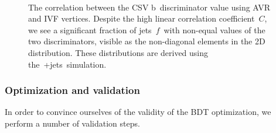 \begin{figure}
\begin{centering}
 \\
\caption{The correlation between the CSV b~discriminator value using AVR and IVF vertices. Despite the high linear correlation coefficient~$C$, we see a significant fraction of jets~$f$~with non-equal values of the two discriminators, visible as the non-diagonal elements in the 2D distribution. These distributions are derived using the~\ttbar+jets~simulation.}
\label{fig:btag_csv_correlation}
\end{centering}
\end{figure}

\subsubsection{Optimization and validation}
In order to convince ourselves of the validity of the BDT optimization, we perform a number of validation steps.

